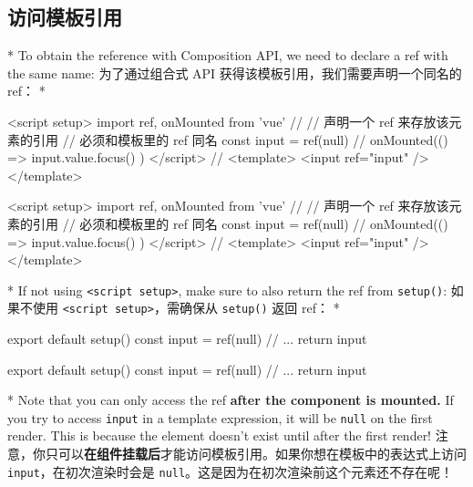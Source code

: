 \begin{paracol}{2}
\subsection{访问模板引用}
\switchcolumn[0]*%
To obtain the reference with Composition API, we need to declare a ref
with the same name:
\switchcolumn
为了通过组合式 API 获得该模板引用，我们需要声明一个同名的 ref：
\switchcolumn[0]*%
\begin{codeHtml}
<script setup>
import { ref, onMounted } from 'vue'
//
// 声明一个 ref 来存放该元素的引用
// 必须和模板里的 ref 同名
const input = ref(null)
//
onMounted(() => {
  input.value.focus()
})
</script>
//
<template>
  <input ref="input" />
</template>
\end{codeHtml}
\switchcolumn
\begin{codeHtml}
<script setup>
import { ref, onMounted } from 'vue'
//
// 声明一个 ref 来存放该元素的引用
// 必须和模板里的 ref 同名
const input = ref(null)
//
onMounted(() => {
  input.value.focus()
})
</script>
//
<template>
  <input ref="input" />
</template>
\end{codeHtml}


\switchcolumn[0]*%
If not using \texttt{\textless{}script\ setup\textgreater{}}, make sure
to also return the ref from \texttt{setup()}:
\switchcolumn
如果不使用 \texttt{\textless{}script\ setup\textgreater{}}，需确保从
\texttt{setup()} 返回 ref：
\switchcolumn[0]*%
\begin{codeJs}
export default {
  setup() {
    const input = ref(null)
    // ...
    return {
      input
    }
  }
}
\end{codeJs}
\switchcolumn
\begin{codeJs}
export default {
  setup() {
    const input = ref(null)
    // ...
    return {
      input
    }
  }
}
\end{codeJs}
\switchcolumn[0]*%
Note that you can only access the ref \textbf{after the component is
mounted.} If you try to access \texttt{input} in a template expression,
it will be \texttt{null} on the first render. This is because the
element doesn't exist until after the first render!
\switchcolumn
注意，你只可以\textbf{在组件挂载后}才能访问模板引用。如果你想在模板中的表达式上访问
\texttt{input}，在初次渲染时会是
\texttt{null}。这是因为在初次渲染前这个元素还不存在呢！



\end{paracol}
